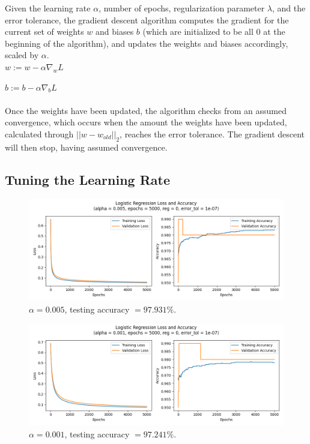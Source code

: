 \documentclass[letter]{article}
\begin{document}
Given the learning rate $\alpha$, number of epochs, regularization parameter $\lambda$, and the error tolerance, the gradient descent algorithm computes the gradient for the current set of weights $w$ and biases $b$ (which are initialized to be all $0$ at the beginning of the algorithm), and updates the weights and biases accordingly, scaled by $\alpha$.\\

$w := w - \alpha \nabla_w L$

$b := b - \alpha \nabla_b L$\\\\
%
Once the weights have been updated, the algorithm checks from an assumed convergence, which occurs when the amount the weights have been updated, calculated through $||w - w_{old}||_2$, reaches the error tolerance. The gradient descent will then stop, having assumed convergence.

\subsection{Tuning the Learning Rate}

\begin{figure}[H]
	\centering
	\includegraphics[width=\linewidth]{Figure_1}
	\caption{$\alpha = 0.005$, testing accuracy $ = 97.931\%$.}
	\label{fig:plot1}
\end{figure}

\begin{figure}[H]
	\centering
	\includegraphics[width=\linewidth]{Figure_2}
	\caption{$\alpha = 0.001$, testing accuracy $ = 97.241\%$.}
	\label{fig:plot2}
\end{figure}
\end{document}
